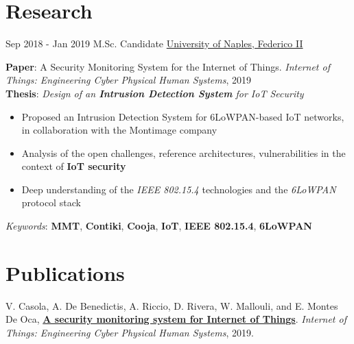 \documentclass[letterpaper]{twentysecondcv} %
\begin{document}
\newpage
\makeextrainfo %

\section{Research}
\begin{twenty}
	\twentyitem
    	{Sep 2018 -}
		{Jan 2019}
        {M.Sc. Candidate}
        {\href{http://www.scuolapsb.unina.it/}{University of Naples, Federico II}}
        {}
        {
       	\textbf{Paper}: A Security Monitoring System for the Internet of Things.  \textit{Internet of Things: Engineering Cyber Physical Human Systems}, 2019 \\
       	\textbf{Thesis}: \textit{Design of an \textbf{Intrusion Detection System} for IoT Security}
        {
            \begin{itemize}
                \item Proposed an Intrusion Detection System for 6LoWPAN-based IoT networks, in collaboration with the Montimage company
                \item Analysis of the open challenges, reference architectures, vulnerabilities in the context of \textbf{IoT security}
                \item Deep understanding of the \textit{IEEE 802.15.4} technologies and the \textit{6LoWPAN} protocol stack
		    \end{itemize}}
            \textit{Keywords}: \textbf{MMT}, \textbf{Contiki}, \textbf{Cooja}, \textbf{IoT}, \textbf{IEEE 802.15.4}, \textbf{6LoWPAN}
        }
\end{twenty}
%
%
\section{Publications}
 V. Casola, A. De Benedictis, A. Riccio, D. Rivera, W. Mallouli, and E. Montes De Oca, \href{https://www.researchgate.net/publication/334175322_A_security_monitoring_system_for_Internet_of_Things}{\textbf{A security monitoring system for Internet of Things}}. \textit{Internet of Things: Engineering Cyber Physical Human Systems}, 2019.
%
%
\end{document}
